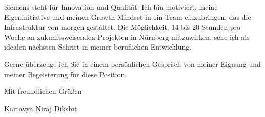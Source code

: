 \documentclass[10pt, a4paper]{article}
\begin{document}
Siemens steht für Innovation und Qualität. Ich bin motiviert, meine Eigeninitiative und meinen Growth Mindset in ein Team einzubringen, das die Infrastruktur von morgen gestaltet. Die Möglichkeit, 14 bis 20 Stunden pro Woche an zukunftsweisenden Projekten in Nürnberg mitzuwirken, sehe ich als idealen nächsten Schritt in meiner beruflichen Entwicklung.

Gerne überzeuge ich Sie in einem persönlichen Gespräch von meiner Eignung und meiner Begeisterung für diese Position.

Mit freundlichen Grüßen

\vspace{1em}

Kartavya Niraj Dikshit
\end{document}
